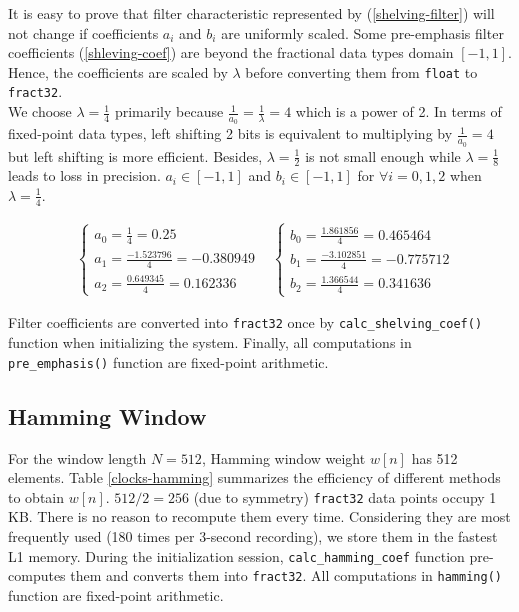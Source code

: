 It is easy to prove that filter characteristic represented by (\ref{shelving-filter}) will not change if coefficients $a_i$ and $b_i$ are uniformly scaled. Some pre-emphasis filter coefficients (\ref{shleving-coef}) are beyond the fractional data types domain $[-1, 1]$. Hence, the coefficients are scaled by $\lambda$ before converting them from \texttt{float} to \texttt{fract32}.\\

We choose $\lambda = \frac{1}{4}$ primarily because $\frac{1}{a_0} = \frac{1}{\lambda} = 4$ which is a power of 2. In terms of fixed-point data types, left shifting 2 bits is equivalent to multiplying by $\frac{1}{a_0} = 4$ but left shifting is more efficient. Besides, $\lambda = \frac{1}{2}$ is not small enough while $\lambda = \frac{1}{8}$ leads to loss in precision. $a_i \in [-1, 1]$ and $b_i \in [-1, 1]$ for $\forall i = 0, 1, 2$ when $\lambda = \frac{1}{4}$.

\begin{align*}
&\begin{cases}
a_0 = \frac{1}{4} = 0.25\\
a_1 = \frac{-1.523796}{4} = -0.380949\\
a_2 = \frac{0.649345}{4} = 0.162336
\end{cases}
&\begin{cases}
b_0 = \frac{1.861856}{4} = 0.465464\\
b_1 = \frac{-3.102851}{4} = -0.775712\\
b_2 = \frac{1.366544}{4} = 0.341636
\end{cases}
\end{align*}

Filter coefficients are converted into \texttt{fract32} once by \texttt{calc\_shelving\_coef()} function when initializing the system. Finally, all computations in \texttt{pre\_emphasis()} function are fixed-point arithmetic.


\subsection{Hamming Window}

For the window length $N = 512$, Hamming window weight $w[n]$ has 512 elements. Table \ref{clocks-hamming} summarizes the efficiency of different methods to obtain $w[n]$. $512/2 = 256$ (due to symmetry) \texttt{fract32} data points occupy 1 KB. There is no reason to recompute them every time. Considering they are most frequently used (180 times per 3-second recording), we store them in the fastest L1 memory. During the initialization session, \texttt{calc\_hamming\_coef} function pre-computes them and converts them into \texttt{fract32}. All computations in \texttt{hamming()} function are fixed-point arithmetic.

